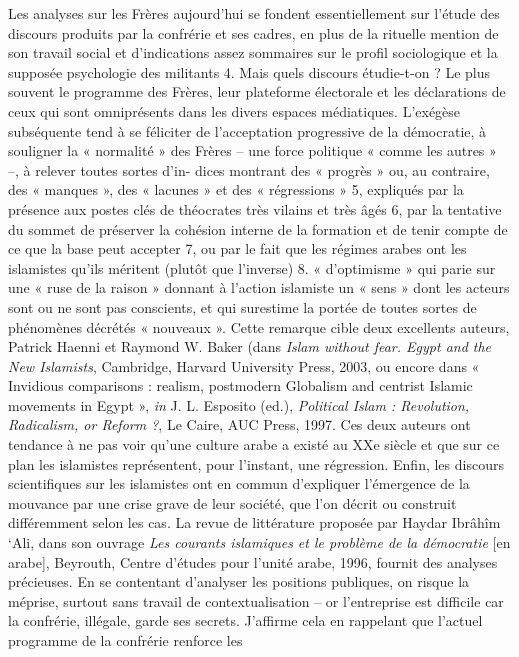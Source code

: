  
Les analyses sur les Frères aujourd'hui se fondent essentiellement sur
l'étude des discours produits par la confrérie et ses cadres, en plus de
la rituelle mention de son travail social et d'indications assez
sommaires sur le profil sociologique et la supposée psychologie des
militants 4.
Mais quels discours étudie-t-on ? Le plus souvent le programme des
Frères, leur plateforme électorale et les déclarations de ceux qui sont
omniprésents dans les divers espaces médiatiques. L'exégèse subséquente
tend à se féliciter de l'acceptation progressive de la démocratie, à
souligner la « normalité » des Frères -- une force politique « comme les
autres » --, à relever toutes sortes d'in- dices montrant des « progrès
» ou, au contraire, des « manques », des « lacunes » et des «
régressions » 5, expliqués par la présence aux postes clés de théocrates
très vilains et très âgés 6, par la tentative du sommet de préserver la
cohésion interne de la formation et de tenir compte de ce que la base
peut accepter 7, ou par le fait que les régimes arabes ont les
islamistes qu'ils méritent (plutôt que l'inverse) 8.
« d'optimisme » qui parie sur une « ruse de la raison » donnant à
l'action islamiste un « sens » dont les acteurs sont ou ne sont pas
conscients, et qui surestime la portée de toutes sortes de phénomènes
décrétés « nouveaux ». Cette remarque cible deux excellents auteurs,
Patrick Haenni et Raymond W. Baker (dans \emph{Islam without fear. Egypt
and the New Islamists}, Cambridge, Harvard University Press, 2003, ou
encore dans « Invidious comparisons : realism, postmodern Globalism and
centrist Islamic movements in Egypt », \emph{in} J. L. Esposito (ed.),
\emph{Political Islam : Revolution, Radicalism, or Reform ?}, Le Caire,
AUC Press, 1997. Ces deux auteurs ont tendance à ne pas voir qu'une
culture arabe a existé au XXe siècle et que sur ce plan les islamistes
représentent, pour l'instant, une régression. Enfin, les discours
scientifiques sur les islamistes ont en commun d'expliquer l'émergence
de la mouvance par une crise grave de leur société, que l'on décrit ou
construit différemment selon les cas. La revue de littérature proposée
par Haydar Ibrâhîm `Ali, dans son ouvrage \emph{Les courants islamiques
et le problème de la démocratie} {[}en arabe{]}, Beyrouth, Centre
d'études pour l'unité arabe, 1996, fournit des analyses précieuses.
En se contentant d'analyser les positions publiques, on risque la
méprise, surtout sans travail de contextualisation -- or l'entreprise
est difficile car la confrérie, illégale, garde ses secrets. J'affirme
cela en rappelant que l'actuel programme de la confrérie renforce les
